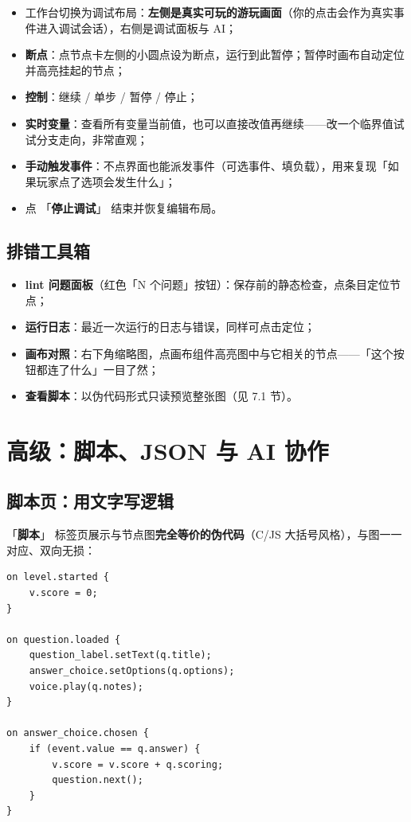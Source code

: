 \documentclass[UTF8,a4paper,zihao=-4]{ctexart}
\newcommand{\ui}[1]{「\textbf{#1}」}  %
\begin{document}
\begin{itemize}[nosep]
  \item 工作台切换为调试布局：\textbf{左侧是真实可玩的游玩画面}（你的点击会作为真实事件进入调试会话），右侧是调试面板与 AI；
  \item \textbf{断点}：点节点卡左侧的小圆点设为断点，运行到此暂停；暂停时画布自动定位并高亮挂起的节点；
  \item \textbf{控制}：继续 / 单步 / 暂停 / 停止；
  \item \textbf{实时变量}：查看所有变量当前值，也可以直接改值再继续——改一个临界值试试分支走向，非常直观；
  \item \textbf{手动触发事件}：不点界面也能派发事件（可选事件、填负载），用来复现「如果玩家点了选项会发生什么」；
  \item 点 \ui{停止调试} 结束并恢复编辑布局。
\end{itemize}

\subsection{排错工具箱}

\begin{itemize}[nosep]
  \item \textbf{lint 问题面板}（红色「N 个问题」按钮）：保存前的静态检查，点条目定位节点；
  \item \textbf{运行日志}：最近一次运行的日志与错误，同样可点击定位；
  \item \textbf{画布对照}：右下角缩略图，点画布组件高亮图中与它相关的节点——「这个按钮都连了什么」一目了然；
  \item \textbf{查看脚本}：以伪代码形式只读预览整张图（见 7.1 节）。
\end{itemize}

\section{高级：脚本、JSON 与 AI 协作}

\subsection{脚本页：用文字写逻辑}

\ui{脚本} 标签页展示与节点图\textbf{完全等价的伪代码}（C/JS 大括号风格），与图一一对应、双向无损：

\begin{lstlisting}
on level.started {
    v.score = 0;
}

on question.loaded {
    question_label.setText(q.title);
    answer_choice.setOptions(q.options);
    voice.play(q.notes);
}

on answer_choice.chosen {
    if (event.value == q.answer) {
        v.score = v.score + q.scoring;
        question.next();
    }
}
\end{lstlisting}
\end{document}
